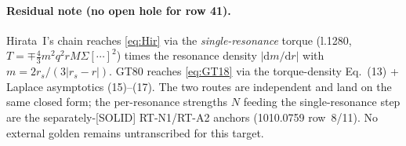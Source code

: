 \documentclass{article}
\newcommand{\rmd}{\mathrm d}
\begin{document}
\paragraph{Residual note (no open hole for row 41).} Hirata~I's chain reaches \eqref{eq:Hir} via the
\emph{single-resonance} torque (l.1280, $T=\mp\tfrac43 m^2q^2rM\Sigma[\cdots]^2$) times the resonance
density $|\rmd m/\rmd r|$ with $m=2r_s/(3|r_s-r|)$. GT80 reaches \eqref{eq:GT18} via the
torque-density Eq.~(13) + Laplace asymptotics (15)--(17). The two routes are independent and land on
the same closed form; the per-resonance strengths $N$ feeding the single-resonance step are the
separately-[SOLID] RT-N1/RT-A2 anchors (1010.0759 row~8/11). No external golden remains untranscribed
for this target.
\end{document}
